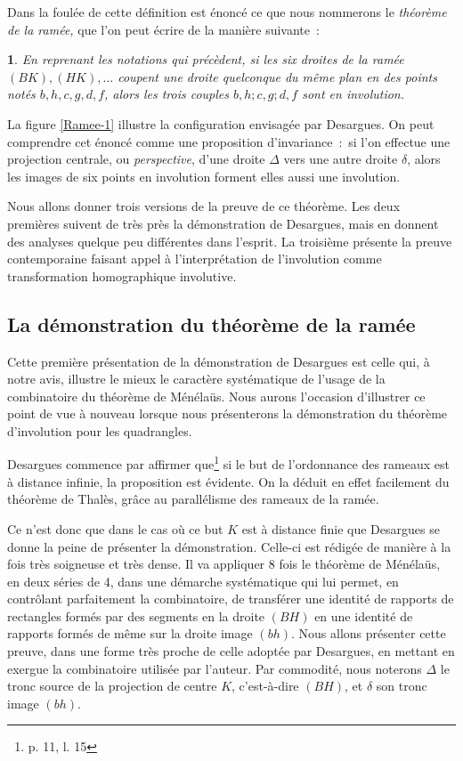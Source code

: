 \documentclass[12pt, a4paper]{article}
\newtheorem{theoreme}{\noindent {\textbf{Th\'eor\`eme}}}[section]
\begin{document}
Dans la foulée de cette définition est énoncé ce que nous nommerons le \textit{théorème de la ramée,} que l'on peut écrire de la manière suivante~:~
\begin{theoreme} En reprenant les notations qui précèdent,  si les six droites de la ramée $(BK), (HK),\ldots$ coupent une  droite quelconque du même plan en des points notés $b,h,c,g,d,f$, alors les trois couples $b,h;c,g;d,f$ sont en involution.
\end{theoreme}
La figure \ref{Ramee-1} illustre la configuration envisagée par Desargues. On peut comprendre cet énoncé comme une proposition d'invariance~:~si l'on effectue une projection centrale, ou \emph{perspective}, d'une droite $\Delta$ vers une autre droite $\delta$, alors les images de six points en involution forment elles aussi une involution.

Nous allons donner trois versions de la preuve de ce théorème. Les deux premières suivent de très près la démonstration de Desargues, mais en donnent des analyses quelque peu différentes dans l'esprit. La troisième présente la preuve contemporaine faisant appel à l'interprétation de l'involution comme transformation homographique involutive.
\subsection{La démonstration du théorème de la ramée}
Cette première présentation de la démonstration de Desargues est celle qui, à notre avis, illustre le mieux le caractère systématique de l'usage de la combinatoire du théorème de Ménélaüs. Nous aurons l'occasion d'illustrer ce point de vue à nouveau lorsque nous présenterons la démonstration du théorème d'involution pour les quadrangles.

Desargues commence par affirmer que\footnote{p. 11, l. 15} si  le but de l'ordonnance des rameaux est à distance infinie,  la proposition est évidente. On la déduit en effet facilement du théorème de Thalès, grâce au parallélisme des rameaux de la ramée. 

Ce n'est donc que dans le cas où ce but $K$ est à distance finie que Desargues se donne la peine de présenter la démonstration. Celle-ci est rédigée de manière à la fois très soigneuse et très dense. Il va appliquer 8 fois le théorème de Ménélaüs, en deux séries de 4, dans une démarche systématique qui lui permet, en contrôlant parfaitement la combinatoire, de transférer une identité de rapports de rectangles formés par des segments en la droite $(BH)$ en une identité de rapports formés de même sur la droite image  $(bh)$. Nous allons présenter cette preuve, dans une forme très proche de celle adoptée par Desargues,  en mettant en exergue la combinatoire utilisée par l'auteur. Par commodité, nous noterons $\Delta$ le tronc source de la projection de centre $K$, c'est-à-dire $(BH)$, et $\delta$ son tronc image $(bh)$.
\end{document}
